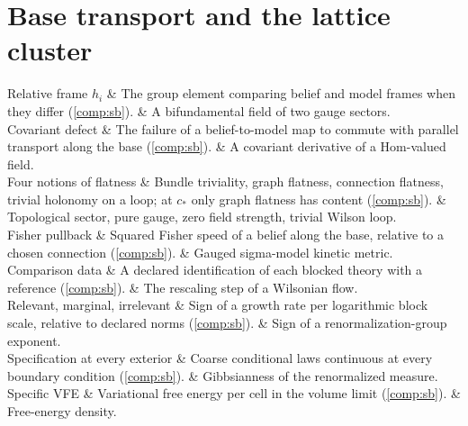 \section*{Base transport and the lattice cluster}

\begin{decoder}
Relative frame $h_i$ & The group element comparing belief and model frames when they differ (\cref{comp:sb}). & A bifundamental field of two gauge sectors. \\
Covariant defect & The failure of a belief-to-model map to commute with parallel transport along the base (\cref{comp:sb}). & A covariant derivative of a Hom-valued field. \\
Four notions of flatness & Bundle triviality, graph flatness, connection flatness, trivial holonomy on a loop; at $c_*$ only graph flatness has content (\cref{comp:sb}). & Topological sector, pure gauge, zero field strength, trivial Wilson loop. \\
Fisher pullback & Squared Fisher speed of a belief along the base, relative to a chosen connection (\cref{comp:sb}). & Gauged sigma-model kinetic metric. \\
Comparison data & A declared identification of each blocked theory with a reference (\cref{comp:sb}). & The rescaling step of a Wilsonian flow. \\
Relevant, marginal, irrelevant & Sign of a growth rate per logarithmic block scale, relative to declared norms (\cref{comp:sb}). & Sign of a renormalization-group exponent. \\
Specification at every exterior & Coarse conditional laws continuous at every boundary condition (\cref{comp:sb}). & Gibbsianness of the renormalized measure. \\
Specific VFE & Variational free energy per cell in the volume limit (\cref{comp:sb}). & Free-energy density. \\
\end{decoder}
